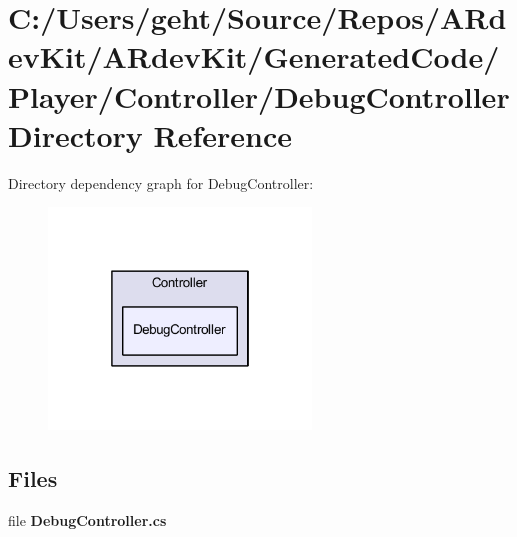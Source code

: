 \section{C\-:/\-Users/geht/\-Source/\-Repos/\-A\-Rdev\-Kit/\-A\-Rdev\-Kit/\-Generated\-Code/\-Player/\-Controller/\-Debug\-Controller Directory Reference}
\label{dir_2afa2a833af711d8532ede1edeeea477}
Directory dependency graph for Debug\-Controller\-:
\nopagebreak
\begin{figure}[H]
\begin{center}
\leavevmode
\includegraphics[width=198pt]{dir_2afa2a833af711d8532ede1edeeea477_dep}
\end{center}
\end{figure}
\subsection*{Files}
\begin{DoxyCompactItemize}
\item 
file {\bfseries Debug\-Controller.\-cs}
\end{DoxyCompactItemize}
